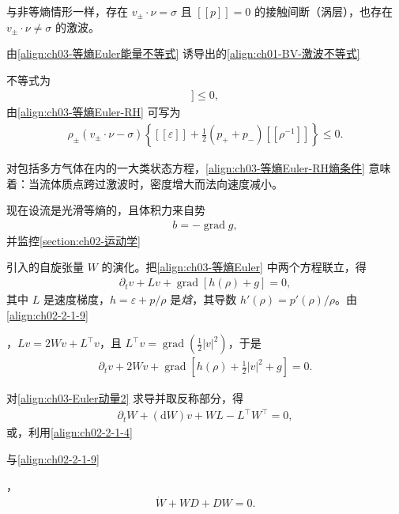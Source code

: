 ﻿\documentclass[../../main.tex]{subfiles}
\begin{document}
与非等熵情形一样，存在 $v_{\pm}\cdot\nu=\sigma$ 且 $[\![p]\!]=0$ 的接触间断（涡层），也存在 $v_{\pm}\cdot\nu\neq\sigma$ 的激波。

由\eqref{align:ch03-等熵Euler能量不等式} 诱导出的\eqref{align:ch01-BV-激波不等式}%

不等式为
\begin{align}
[\![\rho(v\cdot\nu-\sigma)\left(\varepsilon(\rho)+\frac{1}{2}|v|^{2}\right)+p(\rho)v\cdot\nu]\!]\leqslant0,
\label{align:ch03-等熵Euler熵不等式}
\end{align}
由\eqref{align:ch03-等熵Euler-RH} 可写为
\begin{align}
\rho_{\pm}(v_{\pm}\cdot\nu-\sigma)\left\{[\![\varepsilon]\!]+\frac{1}{2}(p_{+}+p_{-})[\![\rho^{-1}]\!]\right\}\leqslant0.
\label{align:ch03-等熵Euler-RH熵条件}
\end{align}

对包括多方气体在内的一大类状态方程，\eqref{align:ch03-等熵Euler-RH熵条件} 意味着：当流体质点跨过激波时，密度增大而法向速度减小。

现在设流是光滑等熵的，且体积力来自势
\begin{align}
b=-\operatorname{grad}g,
\label{align:ch03-体积力势}
\end{align}
并监控\cref{section:ch02-运动学}%

引入的自旋张量 $W$ 的演化。把\eqref{align:ch03-等熵Euler} 中两个方程联立，得
\begin{align}
\partial_{t}v+Lv+\operatorname{grad}[h(\rho)+g]=0,
\label{align:ch03-Euler动量}
\end{align}
其中 $L$ 是速度梯度，$h=\varepsilon+p/\rho$ 是\emph{焓}，其导数 $h'(\rho)=p'(\rho)/\rho$。由\eqref{align:ch02-2-1-9}%

，$Lv=2Wv+L^{\top}v$，且 $L^{\top}v=\operatorname{grad}\left(\frac{1}{2}|v|^{2}\right)$，于是
\begin{align}
\partial_{t}v+2Wv+\operatorname{grad}\left[h(\rho)+\frac{1}{2}|v|^{2}+g\right]=0.
\label{align:ch03-Euler动量2}
\end{align}

对\eqref{align:ch03-Euler动量2} 求导并取反称部分，得
\begin{align}
\partial_{t}W+(\mathrm{d}W)v+WL-L^{\top}W^{\top}=0,
\label{align:ch03-涡量方程}
\end{align}
或，利用\eqref{align:ch02-2-1-4}%

与\eqref{align:ch02-2-1-9}%

，
\begin{align}
\dot{W}+WD+DW=0.
\label{align:ch03-涡量方程2}
\end{align}
\end{document}
